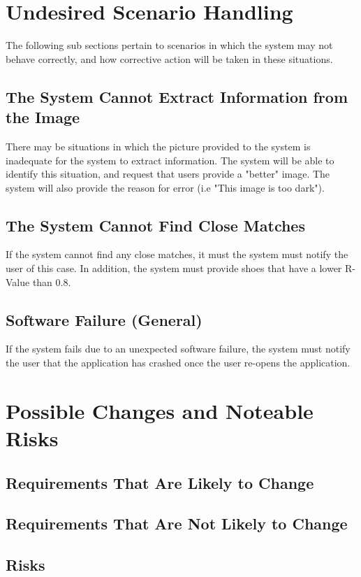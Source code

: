 \documentclass[12pt, titlepage]{article}
\begin{document}
\section{Undesired Scenario Handling}
The following sub sections pertain to scenarios in which the system may not behave correctly, and how corrective action will be taken in these situations.
\subsection{The System Cannot Extract Information from the Image}

There may be situations in which the picture provided to the system is inadequate for the system to extract information. The system will be able to identify this situation, and request that users provide a "better" image. The system will also provide the reason for error (i.e "This image is too dark").

\subsection{The System Cannot Find Close Matches}

If the system cannot find any close matches, it must the system must notify the user of this case. In addition, the system must provide shoes that have a lower R-Value than 0.8.

\subsection{Software Failure (General)}

If the system fails due to an unexpected software failure, the system must notify the user that the application has crashed once the user re-opens the application.


\section{Possible Changes and Noteable Risks}
\subsection{Requirements That Are Likely to Change}

\subsection{Requirements That Are Not Likely to Change}

\subsection{Risks}
\end{document}
